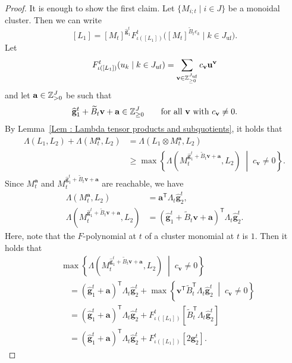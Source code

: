 \begin{proof}
It is enough to show the first claim.
Let $\{M_{i;t} \mid i \in J\}$ be a monoidal cluster.
Then we can write
\[
[L_1]
= [M_t]^{\widehat{\mathbf{g}}_1^t}
F_{\iota([L_1])}^t
\bigl([M_t]^{\widetilde{B}_t e_k} \mid k \in J_{\mathrm{uf}}\bigr).
\]
Let
\[
F_{\iota([L_1])}^t(u_k \mid k \in J_{\mathrm{uf}})
= \sum_{\mathbf{v} \in \mathbb{Z}_{\geq 0}^{J_{\mathrm{uf}}}}
c_{\mathbf{v}}\mathbf{u}^{\mathbf{v}}
\]
and let $\mathbf{a} \in \mathbb{Z}_{>0}^J$ be such that
\[
\widehat{\mathbf{g}}_1^t + \widetilde{B}_t\mathbf{v} + \mathbf{a}
\in \mathbb{Z}_{\geq 0}^J
\qquad\text{for all $\mathbf{v}$ with $c_{\mathbf{v}} \neq 0$}.
\]
By Lemma~\ref{Lem : Lambda tensor products and subquotients},
it holds that
\[
\begin{aligned}
\Lambda(L_1, L_2) + \Lambda(M_t^{\mathbf{a}}, L_2)
&= \Lambda(L_1 \otimes M_t^{\mathbf{a}}, L_2) \\
&\geq \max\left\{
\Lambda\left(
M_t^{\widehat{\mathbf{g}}_1^t + \widetilde{B}_t\mathbf{v} + \mathbf{a}},
L_2\right)
\;\middle|\; c_{\mathbf{v}} \neq 0
\right\}.
\end{aligned}
\]
Since $M_t^{\mathbf{a}}$ and
$M_t^{\widehat{\mathbf{g}}_1^t + \widetilde{B}_t\mathbf{v} + \mathbf{a}}$
are reachable, we have
\[
\begin{aligned}
\Lambda(M_t^{\mathbf{a}}, L_2)
&= \mathbf{a}^{\mathsf{T}}\Lambda_t\widehat{\mathbf{g}}_2^t, \\
\Lambda\left(
M_t^{\widehat{\mathbf{g}}_1^t + \widetilde{B}_t\mathbf{v} + \mathbf{a}},
L_2\right)
&= (\widehat{\mathbf{g}}_1^t + \widetilde{B}_t\mathbf{v}
+ \mathbf{a})^{\mathsf{T}}\Lambda_t\widehat{\mathbf{g}}_2^t.
\end{aligned}
\]
Here, note that the $F$-polynomial at $t$ of a cluster monomial
at $t$ is $1$.
Then it holds that
\[
\begin{aligned}
&\max\left\{
\Lambda\left(
M_t^{\widehat{\mathbf{g}}_1^t + \widetilde{B}_t\mathbf{v} + \mathbf{a}},
L_2\right)
\;\middle|\; c_{\mathbf{v}} \neq 0
\right\} \\
&\quad = (\widehat{\mathbf{g}}_1^t + \mathbf{a})^{\mathsf{T}}
\Lambda_t\widehat{\mathbf{g}}_2^t
+ \max\left\{
\mathbf{v}^{\mathsf{T}}\widetilde{B}_t^{\mathsf{T}}
\Lambda_t\widehat{\mathbf{g}}_2^t
\;\middle|\; c_{\mathbf{v}} \neq 0
\right\} \\
&\quad = (\widehat{\mathbf{g}}_1^t + \mathbf{a})^{\mathsf{T}}
\Lambda_t\widehat{\mathbf{g}}_2^t
+ F_{\iota([L_1])}^t
[\widetilde{B}_t^{\mathsf{T}}\Lambda_t\widehat{\mathbf{g}}_2^t] \\
&\quad = (\widehat{\mathbf{g}}_1^t + \mathbf{a})^{\mathsf{T}}
\Lambda_t\widehat{\mathbf{g}}_2^t
+ F_{\iota([L_1])}^t[2\mathbf{g}_2^t].
\end{aligned}
\]
\end{proof}
